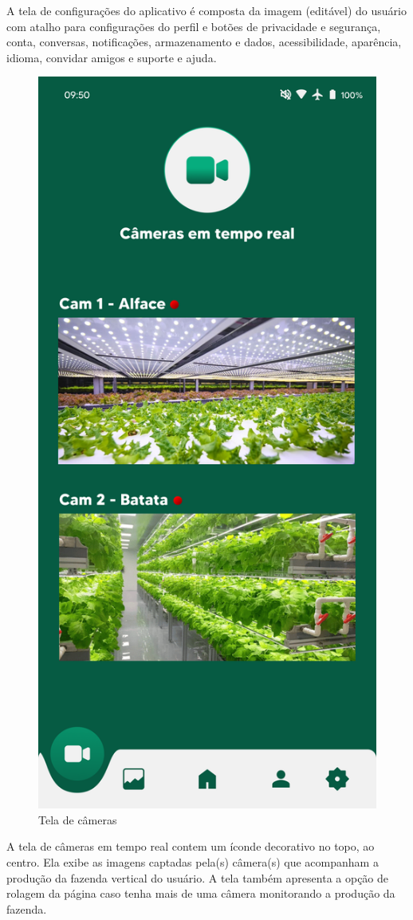 A tela de configurações do aplicativo é composta da imagem (editável) do usuário com atalho para configurações do perfil e botões de privacidade e segurança, conta, conversas, notificações, armazenamento e dados, acessibilidade, aparência, idioma, convidar amigos e suporte e ajuda.

\begin{figure}[!h]
\centering
\caption{Tela de câmeras}
\label{fig:picture7}
\includegraphics[scale=0.3]{Illustrations/Picture7.png}
\end{figure}
A tela de câmeras em tempo real contem um íconde decorativo no topo, ao centro. Ela exibe as imagens captadas pela(s) câmera(s) que acompanham a produção da fazenda vertical do usuário. A tela também apresenta a opção de rolagem da página caso tenha mais de uma câmera monitorando a produção da fazenda.

